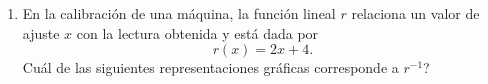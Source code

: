 \documentclass[12pt]{article}
\begin{document}
\begin{enumerate}[label=\textbf{\arabic*.}, start=29, itemsep=1cm]
De acuerdo con la informaci\'on anterior, para empacar $60$ frascos se requieren

\begin{enumerate}[label=\Alph*)]
  \item $3$ cajas.
  \item $5$ cajas.
  \item $10$ cajas.
  \item $60$ cajas.
\end{enumerate}

\Needspace{0.88\textheight}
\item
En la calibraci\'on de una m\'aquina, la funci\'on lineal $r$ relaciona un valor de ajuste $x$ con la lectura obtenida y est\'a dada por
\[
  r(x)=2x+4.
\]
\textquestiondown Cu\'al de las siguientes representaciones gr\'aficas corresponde a $r^{-1}$?


\end{enumerate}
\end{document}

